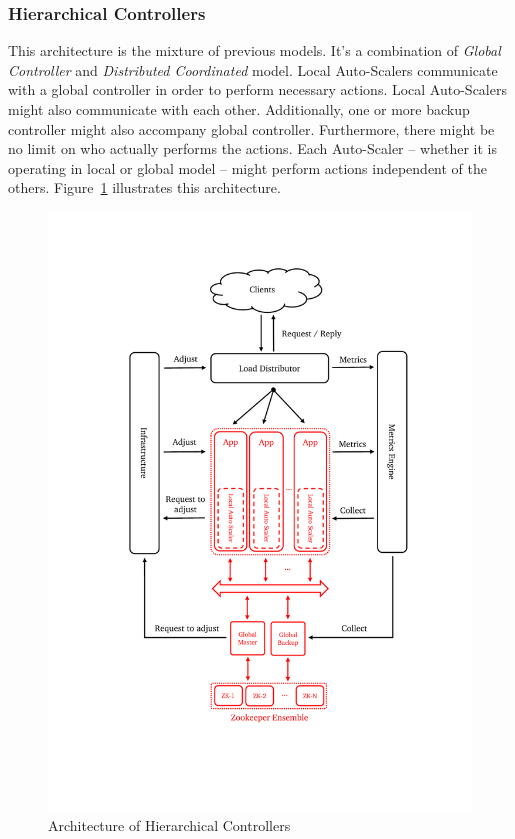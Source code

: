 \subsubsection{Hierarchical Controllers}
This architecture is the mixture of previous models. It's a combination of \emph{Global Controller} and \emph{Distributed Coordinated} model. Local Auto-Scalers communicate with a global controller in order to perform necessary actions. Local Auto-Scalers might also communicate with each other. Additionally, one or more backup controller might also accompany global controller. Furthermore, there might be no limit on who actually performs the actions. Each Auto-Scaler -- whether it is operating in local or global model -- might perform actions independent of the others. Figure~\ref{fig:auto-scaler-hierar} illustrates this architecture.
\begin{figure}[!htbp]
    \includegraphics[clip,trim=3cm 4.2cm 2.5cm 2.8cm,scale=0.8]{auto-scaler-hierarchy.pdf}
    \centering
    \caption{Architecture of Hierarchical Controllers}
    \label{fig:auto-scaler-hierar}
\end{figure}
\clearpage
